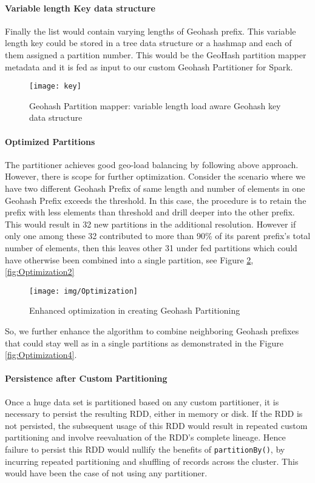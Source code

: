 \documentclass[article,type=msc,colorback,10pt,accentcolor=tud1d]{tudthesis}
\begin{document}
			\paragraph{Variable length Key data structure}
				\par Finally the list would contain varying lengths of Geohash prefix. This variable length key could be stored in a tree data structure or a hashmap and each of them assigned a partition number. This would be the GeoHash partition mapper metadata and it is fed as input to our custom Geohash Partitioner for Spark. \\
			
					\begin{figure}[h]
						\centering
						\texttt{[image: key]}
						\caption{Geohash Partition mapper: variable length load aware Geohash key data structure}
						\label{fig:keydatastrucutre}
					\end{figure}
			 \clearpage
			\paragraph{Optimized Partitions}
			The partitioner achieves good geo-load balancing by following above approach. However, there is scope for further optimization. Consider the scenario where we have two different Geohash Prefix of same length and number of elements in one Geohash Prefix exceeds the threshold. In this case, the procedure is to retain the prefix with less elements than threshold and drill deeper into the other prefix. This would result in 32 new partitions in the additional resolution. However if only one among these 32 contributed to more than 90\% of its parent prefix's total number of elements, then this leaves other 31 under fed partitions which could have otherwise been combined into a single partition, see Figure \ref{fig:Optimization}, \ref{fig:Optimization2}
									
				\begin{figure} [h]
				\centering
				\texttt{[image: img/Optimization]}
				\caption{Enhanced optimization in creating Geohash Partitioning}
				\label{fig:Optimization}
				\end{figure}
			So, we further enhance the algorithm to combine neighboring Geohash prefixes that could stay well as in a single partitions as demonstrated in the Figure \ref{fig:Optimization4}.		
			
			\paragraph{Persistence after Custom Partitioning}		
			Once a huge data set is partitioned based on any custom partitioner, it is necessary to persist the resulting RDD, either in memory or disk. If the RDD is not persisted, the subsequent usage of this RDD would result in repeated custom partitioning and involve reevaluation of the RDD's complete lineage. Hence failure to persist this RDD would nullify the benefits of \texttt{partitionBy()}, by incurring repeated partitioning and shuffling of records across the cluster. This would have been the case of not using any partitioner. \cite{sparkbook}
			
\end{document}
